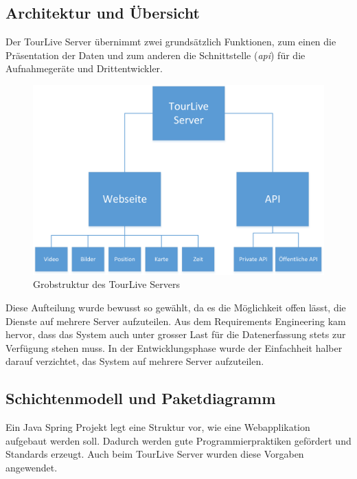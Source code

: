 \subsection{Architektur und Übersicht}
Der TourLive Server übernimmt zwei grundsätzlich Funktionen, zum einen die Präsentation der Daten und zum anderen die Schnittstelle (\textit{\gls{api}}) für die Aufnahmegeräte und Drittentwickler.
\begin{figure}[H]
	\centering
	\includegraphics[width=140mm]{images/tourliveweb/uebersicht_tourlive.png}
	\caption{Grobstruktur des TourLive Servers}
	\label{fig:grobstrukturtourliveserver}
\end{figure}
Diese Aufteilung wurde bewusst so gewählt, da es die Möglichkeit offen lässt, die Dienste auf mehrere Server aufzuteilen. Aus dem Requirements Engineering kam hervor, dass das System auch unter grosser Last für die Datenerfassung stets zur Verfügung stehen muss. In der Entwicklungsphase wurde der Einfachheit halber darauf verzichtet, das System auf mehrere Server aufzuteilen.

\subsection{Schichtenmodell und Paketdiagramm}
Ein Java Spring Projekt legt eine Struktur vor, wie eine Webapplikation aufgebaut werden soll. Dadurch werden gute Programmierpraktiken gefördert und Standards erzeugt. Auch beim TourLive Server wurden diese Vorgaben angewendet.

